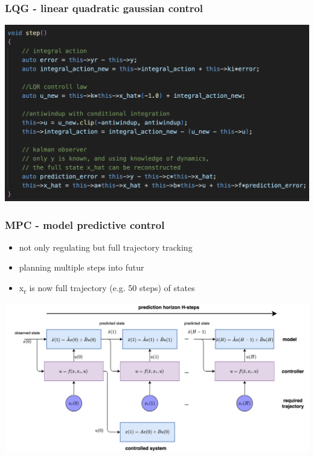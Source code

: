 \documentclass{beamer}
\begin{document}
\begin{frame}
  \frametitle{\bf LQG - linear quadratic gaussian control}
  {\centering \includegraphics[scale=0.4]{../diagrams/controll/lqg_cpp.png}}

\end{frame}


\begin{frame}
  \frametitle{\bf MPC - model predictive control}

  \begin{itemize}
    \item not only regulating but full trajectory tracking
    \item planning multiple steps into futur
    \item x\textsubscript{r} is now full trajectory (e.g. 50 steps) of states
  \end{itemize}

  {\centering \includegraphics[scale=0.4]{../diagrams/controll/control-mpc_steps.png}}

\end{frame}
\end{document}
